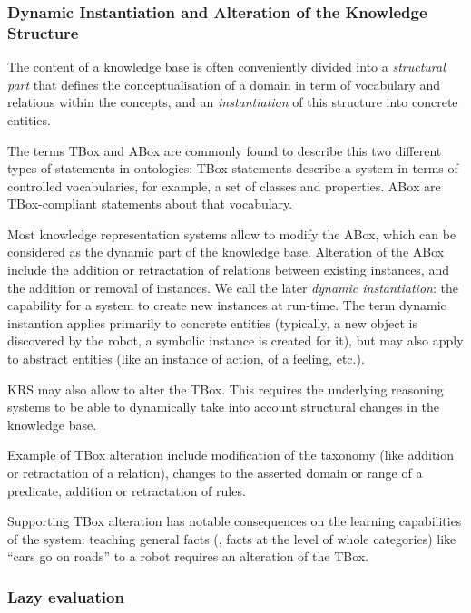 \subsubsection{Dynamic Instantiation and Alteration of the Knowledge Structure}

The content of a knowledge base is often conveniently divided into a
\emph{structural part} that defines the conceptualisation of a domain in term
of vocabulary and relations within the concepts, and an \emph{instantiation} of
this structure into concrete entities.

The terms TBox and ABox are commonly found to describe this two different types of
statements in ontologies: TBox statements describe a system in terms of
controlled vocabularies, for example, a set of classes and properties. ABox are
TBox-compliant statements about that vocabulary.

Most knowledge representation systems allow to modify the ABox, which can be
considered as the dynamic part of the knowledge base. Alteration of the ABox
include the addition or retractation of relations between existing instances,
and the addition or removal of instances. We call the later \emph{dynamic
instantiation}: the capability for a system to create new instances at
run-time. The term dynamic instantion applies primarily to concrete entities
(typically, a new object is discovered by the robot, a symbolic instance is
created for it), but may also apply to abstract entities (like an instance of
action, of a feeling, etc.).

KRS may also allow to alter the TBox. This requires the underlying reasoning
systems to be able to dynamically take into account structural changes in the
knowledge base.

Example of TBox alteration include modification of the taxonomy (like addition
or retractation of a  relation), changes to the asserted
domain or range of a predicate, addition or retractation of rules.

Supporting TBox alteration has notable consequences on the learning
capabilities of the system: teaching general facts (\ie, facts at the level of
whole categories) like ``cars go on roads'' to a robot requires an alteration
of the TBox.

\subsubsection{Lazy evaluation}
\label{sect|lazy-evaluation}

